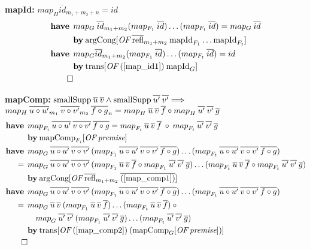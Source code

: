 \newcommand{\have}{\textbf{have}\:\:}
\newcommand{\by}{\textbf{by}\:}

\textbf{mapId:} $map_H \overline{id}_{m_1+m_2+n} = id$
\begin{align}
\have & map_G \: \overline{id}_{m_1+m_2} (map_{F_1} \: \overline{id}) \dots (map_{F_t} \: \overline{id}) = map_G \: \overline{id} \label{map_id1} \\*
 & \by \OF{\text{argCong}}{\overline{\text{refl}}_{m_1+m_2} \: \text{mapId}_{F_1} \dots \text{mapId}_{F_t}} \nonumber \\
\have & map_G \overline{id}_{m_1+m_2} (map_{F_1} \: \overline{id}) \dots (map_{F_t} \: \overline{id}) = id \\*
& \by \OF{\text{trans}}{(\ref{map_id1}) \: \text{mapId}_G} \nonumber \\*
\qed \nonumber
\end{align}

\textbf{mapComp:} $\text{smallSupp} \: \overline{u} \: \overline{v} \wedge \text{smallSupp} \: \overline{u'} \: \overline{v'} \Longrightarrow$ \\
\hspace*{1.7em} $map_H \: \overline{u \circ u'}_{m_1} \: \overline{v \circ v'}_{m_2} \: \overline{f \circ g}_n = {map}_{H} \: \overline{u} \: \overline{v} \: \overline{f} \circ {map}_{H} \: \overline{u'} \: \overline{v'} \: \overline{g}$
\begin{align}
\have & \map{F_i}{u \circ u'}{v \circ v'}{f \circ g} = \map{F_i}{u}{v}{f} \: \circ \: \map{F_i}{u'}{v'}{g} \label{map_comp1} \\*
 & \by \OF{\text{mapComp}_{F_i}}{\textit{premise}} \nonumber \\
%
\have & \map{G}{u \circ u'}{v \circ v'}{}(\map{F_1}{u \circ u'}{v \circ v'}{f \circ g})\dots(\map{F_t}{u \circ u'}{v \circ v'}{f \circ g}) \nonumber \\*
= \:\: & \map{G}{u \circ u'}{v \circ v'}{}(\map{F_1}{u}{v}{f} \circ \map{F_1}{u'}{v'}{g})\dots(\map{F_t}{u}{v}{f} \circ \map{F_t}{u'}{v'}{g}) \label{map_comp2} \\*
& \by \OF{\text{argCong}}{\overline{\text{refl}}_{m_1+m_2} \: \overline{(\ref{map_comp1})}} \nonumber \\
%
\have & \map{G}{u \circ u'}{v \circ v'}{}(\map{F_1}{u \circ u'}{v \circ v'}{f \circ g})\dots(\map{F_t}{u \circ u'}{v \circ v'}{f \circ g}) \nonumber \\*
= \:\: & \map{G}{u}{v}{}(\map{F_1}{u}{v}{f})\dots(\map{F_t}{u}{v}{f}) \: \circ \nonumber \\*
& \quad \map{G}{u'}{v'}{}(\map{F_1}{u'}{v'}{g})\dots(\map{F_t}{u'}{v'}{g}) \label{map_comp3} \\*
& \by \OF{\text{trans}}{(\ref{map_comp2}) \: (\OF{\text{mapComp}_G}{\textit{premise}})} \nonumber \\*
\qed \nonumber
\end{align}

